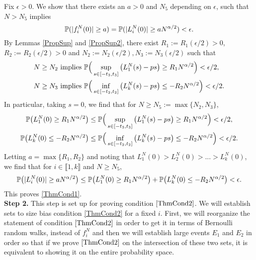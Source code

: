 	Fix $\epsilon>0$. We show that there exists an $a>0$ and $N_5$ depending on $\epsilon$, such that $N>N_5$ implies
	$$\mathbb{P}(|f^N_i(0)|\geq a) = \mathbb{P}(|L_i^N(0)|\geq a N^{\alpha/2})<\epsilon.$$
	By Lemmas \ref{PropSup} and \ref{PropSup2}, there exist $R_1 := R_1(\epsilon/2)>0$, $R_2 := R_2(\epsilon/2)>0$ and $N_2 := N_2(\epsilon/2),N_3 := N_3(\epsilon/2)$ such that 
	\begin{align*}
	N\geq N_2 &\text{ implies } \mathbb{P}\Big(\sup_{s\in[-t_3,t_3]}\left(L_1^N(s)-ps\right)\geq R_1N^{\alpha/2}\Big)<\epsilon/2,\\
	N\geq N_3 &\text{ implies } \mathbb{P}\Big(\inf_{s\in[-t_2,t_2]}\left(L_k^N(s)-ps\right)\leq -R_2 N^{\alpha/2}\Big)<\epsilon/2.
	\end{align*}
	In particular, taking $s=0$, we find that for $N\geq N_5:= \max\{N_2, N_3\}$, 
	\begin{align*}
	\mathbb{P}\big(L_1^N(0)\geq R_1N^{\alpha/2}\big) &\leq \mathbb{P}\Big(\sup_{s\in[-t_3,t_3]}\left(L_1^N(s)-ps\right)\geq R_1N^{\alpha/2}\Big)< \epsilon/2,\\
	\mathbb{P}\big(L_k^N(0)\leq -R_2N^{\alpha/2}\big) &\leq \mathbb{P}\Big(\inf_{s\in[-t_2,t_2]}\left(L_k^N(s)-ps\right)\leq -R_2N^{\alpha/2}\Big)< \epsilon/2.
	\end{align*}
	Letting $a =\max\{ R_1, R_2\}$ and noting that $L_1^N(0)>L_2^N(0)>...>L_k^N(0)$, we find that for $i\in\llbracket 1,k\rrbracket$ and $N \geq N_5$,
	$$\mathbb{P}\big(|L_i^N(0)|\geq a N^{\alpha/2}\big)\leq \mathbb{P}\big(L_1^N(0)\geq R_1 N^{\alpha/2}\big) + \mathbb{P}\big(L_k^N(0)\leq -R_2N^{\alpha/2}\big) < \epsilon.$$
	This proves \eqref{ThmCond1}.\\
	
	\noindent\textbf{Step 2.} This step is set up for proving condition $\eqref{ThmCond2}$. We will establish sets to size bias condition \eqref{ThmCond2} for a fixed $i$. First, we will reorganize the statement of condition $\eqref{ThmCond2}$ in order to get it in terms of Bernoulli random walks, instead of $f_i^N$ and then we will establish large events $E_1$ and $E_2$ in order so that if we prove $\eqref{ThmCond2}$ on the intersection of these two sets, it is equivalent to showing it on the entire probability space.
	
